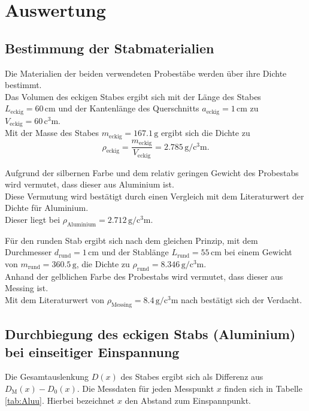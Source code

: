 \section{Auswertung}
\label{sec:Auswertung}
\subsection{Bestimmung der Stabmaterialien}
Die Materialien der beiden verwendeten Probestäbe werden über ihre Dichte bestimmt.\\
Das Volumen des eckigen Stabes ergibt sich mit der Länge des Stabes $L_{\mathrm{eckig}}=60\,\si{\centi\meter}$
und der Kantenlänge des Querschnitts $a_{\mathrm{eckig}}=1\,\si{\centi\meter}$ zu $V_{\mathrm{eckig}}=60\,\si{\cubic\centi\meter}$.\\
Mit der Masse des Stabes $m_{\mathrm{eckig}}=167.1\,\si{\gram}$ ergibt sich die Dichte zu
\begin{equation}
	\rho_{\mathrm{eckig}}=\frac{m_{\mathrm{eckig}}}{V_{\mathrm{eckig}}}=2.785 \,\si{\gram\per\cubic\centi\meter}\text{.}
\end{equation}

Aufgrund der silbernen Farbe und dem relativ geringen Gewicht des Probestabs wird vermutet, dass dieser aus Aluminium ist.\\
Diese Vermutung wird bestätigt durch einen Vergleich mit dem Literaturwert der Dichte für Aluminium.\\
Dieser liegt bei $\rho_{\mathrm{Aluminium}}=2.712\,\si{\gram\per\cubic\centi\meter}$. \cite{Werkzeugkiste}

Für den runden Stab ergibt sich nach dem gleichen Prinzip, mit dem Durchmesser $d_{\mathrm{rund}}=1\,\si{\centi\meter}$ und der Stablänge $L_{\mathrm{rund}}=55\,\si{\centi\meter}$ bei einem
Gewicht von $m_{\mathrm{rund}}=360.5\,\si{\gram}$, die Dichte zu $\rho_{\mathrm{rund}}=8.346 \,\si{\gram\per\cubic\centi\meter}$.\\
Anhand der gelblichen Farbe des Probestabs wird vermutet, dass dieser aus Messing ist.\\
Mit dem Literaturwert von $\rho_{\mathrm{Messing}}=8.4\,\si{\gram\per\cubic\centi\meter}$ nach \cite{Werkzeugkiste} %
bestätigt sich der Verdacht.

\FloatBarrier
\subsection{Durchbiegung des eckigen Stabs (Aluminium) bei einseitiger Einspannung}
Die Gesamtauslenkung $D(x)$ des Stabes ergibt sich als Differenz aus $D_{\mathrm{M}}(x)-D_{\mathrm{0}}(x)$.
Die Messdaten für jeden Messpunkt $x$ finden sich in Tabelle \ref{tab:Aluu}. Hierbei bezeichnet $x$ den Abstand zum Einspannpunkt.

